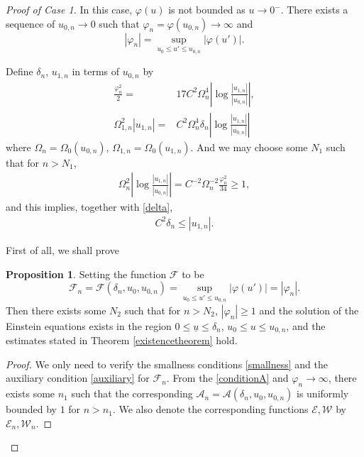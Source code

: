 \documentclass[11pt,reqno]{amsart}
\theoremstyle{definition}
\newtheorem{proposition}{Proposition}[section]
\numberwithin{equation}{section}
\def\ub{\underline{u}}
\begin{document}
\begin{proof}[Proof of Case 1] %


In this case, $\varphi(u)$ is not bounded as $u\to0^-$. There exists a sequence of $u_{0,n}\to0$ such that $\varphi_n=\varphi(u_{0,n})\to\infty$ and $$|\varphi_n|=\displaystyle\sup_{u_0\le u'\le u_{0,n}}|\varphi(u')|.$$



Define $\delta_n$, $u_{1,n}$ in terms of $u_{0,n}$ by
\begin{align}
\label{u*}\frac{\varphi_n^2}{2}=&17C^2\Omega_n^4\left|\log\frac{|u_{1,n}|}{|u_{0,n}|}\right|,\\
\label{delta}\Omega_{1,n}^2|u_{1,n}|=&C^2\Omega_n^4\delta_n\left|\log\frac{|u_{1,n}|}{|u_{0,n}|}\right|
\end{align}
where $\Omega_n=\Omega_0(u_{0,n})$,  $\Omega_{1,n}=\Omega_0(u_{1,n})$. And we may choose some $N_1$ such that for $n>N_1$,
\begin{align}\label{F*n>=1}
\Omega_n^2\left|\log\frac{|u_{1,n}|}{|u_{0,n}|}\right|=C^{-2}\Omega_n^{-2}\frac{\varphi_n^2}{34} \ge1,
\end{align}
and this implies, together with \eqref{delta},
\begin{align}\label{estimate-deltan}
 C^2\delta_n\le|u_{1,n}|.
\end{align}

First of all, we shall prove
\begin{proposition}\label{u0toun}Setting the function $\mathscr{F}$ to be
 $$\displaystyle\mathscr{F}_n=\mathscr{F}(\delta_n,u_0,u_{0,n})=\sup_{u_0\le u'\le u_{0,n}}|\varphi(u')|=|\varphi_n|.$$
Then there exists some $N_2$ such that for $n>N_2$, $|\varphi_n|\ge1$ and the solution of the Einstein equations exists in the region $0\le\ub\le\delta_n$, $u_0\le u\le u_{0,n}$, and the estimates stated in Theorem \ref{existencetheorem} hold.
\end{proposition}

 \begin{proof} We only need to verify the smallness conditions \eqref{smallness} and the auxiliary condition \eqref{auxiliary} for $\mathscr{F}_n$. From the \eqref{conditionA} and $\varphi_n\to\infty$, there exists some $n_1$ such that the corresponding $\mathcal{A}_n=\mathcal{A}(\delta_n,u_0,u_{0,n})$ is uniformly bounded by $1$ for $n>n_1$. We also denote the corresponding functions $\mathscr{E},\mathscr{W}$ by $\mathscr{E}_{n},\mathscr{W}_{n}$.


\end{proof}
\end{proof}
\end{document}
